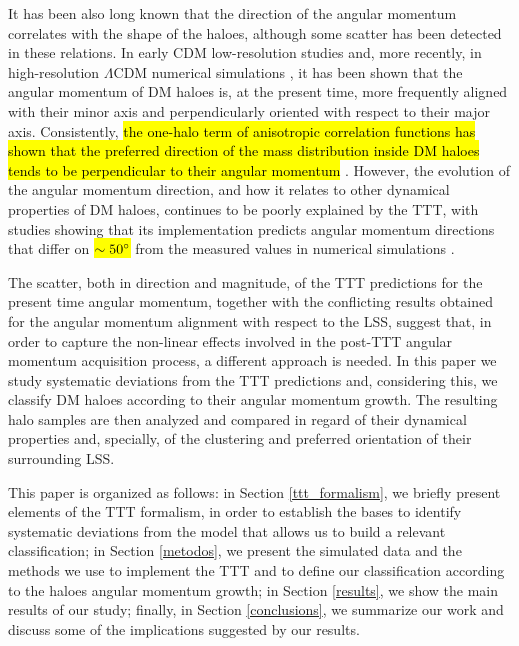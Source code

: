 \documentclass[fleqn,usenatbib]{mnras}
\begin{document}
It has been also long known that the direction of the angular momentum correlates with the shape of the haloes, although some scatter has been detected in these relations. In early CDM low-resolution studies \citep{barnesyefstathiou1987,warrenetal1992} and, more recently, in high-resolution $\Lambda$CDM numerical simulations \citep{bailinysteinmetz2005}, it has been shown that the angular momentum of DM haloes is, at the present time, more frequently aligned with their minor axis and perpendicularly oriented with respect to their major axis. 
Consistently, \hl{the one-halo term of anisotropic correlation functions has shown that the preferred direction of the mass distribution inside DM haloes tends to be perpendicular to their angular momentum} \citep{pazetal2008}.
However, the evolution of the angular momentum direction, and how it relates to other dynamical properties of DM haloes, continues to be poorly explained by the TTT, with studies showing that its implementation predicts angular momentum directions that differ on \hl{$\sim 50\hbox{$^\circ$}$} from the measured values in numerical simulations \citep{porcianietal2002a}.

The scatter, both in direction and magnitude, of the TTT predictions for the present time angular momentum, together with the conflicting results obtained for the angular momentum alignment with respect to the LSS, suggest that, in order to capture the non-linear effects involved in the post-TTT angular momentum acquisition process, a different approach is needed. In this paper we study systematic deviations from the TTT predictions and, considering this, we classify DM haloes according to their angular momentum growth. The resulting halo samples are then analyzed and compared in regard of their dynamical properties and, specially, of the clustering and preferred orientation of their surrounding LSS. 

This paper is organized as follows: in Section \ref{ttt_formalism}, we briefly present elements of the TTT formalism, in order to establish the bases to identify systematic deviations from the model that allows us to build a relevant classification; in Section \ref{metodos}, we present the simulated data and the methods we use to implement the TTT and to define our classification according to the haloes angular momentum growth; in Section \ref{results}, we show the main results of our study; finally, in Section \ref{conclusions}, we summarize our work and discuss some of the implications suggested by our results.
\end{document}
